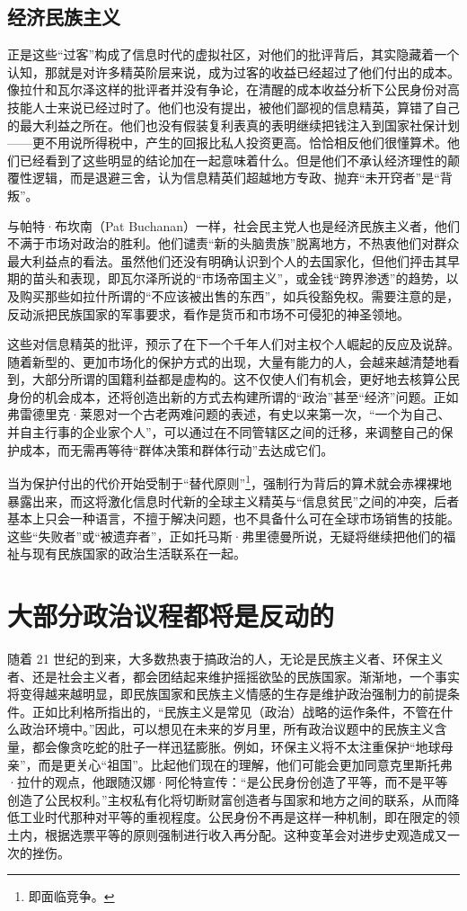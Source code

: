 \subsection{经济民族主义}
正是这些“过客”构成了信息时代的虚拟社区，对他们的批评背后，其实隐藏着一个认知，那就是对许多精英阶层来说，成为过客的收益已经超过了他们付出的成本。像拉什和瓦尔泽这样的批评者并没有争论，在清醒的成本收益分析下公民身份对高技能人士来说已经过时了。他们也没有提出，被他们鄙视的信息精英，算错了自己的最大利益之所在。他们也没有假装复利表真的表明继续把钱注入到国家社保计划——更不用说所得税中，产生的回报比私人投资更高。恰恰相反他们很懂算术。他们已经看到了这些明显的结论加在一起意味着什么。但是他们不承认经济理性的颠覆性逻辑，而是退避三舍，认为信息精英们超越地方专政、抛弃“未开窍者”是“背叛”。

与帕特·布坎南（Pat Buchanan）一样，社会民主党人也是经济民族主义者，他们不满于市场对政治的胜利。他们谴责“新的头脑贵族”脱离地方，不热衷他们对群众最大利益点的看法。虽然他们还没有明确认识到个人的去国家化，但他们抨击其早期的苗头和表现，即瓦尔泽所说的“市场帝国主义”，或金钱“跨界渗透”的趋势，以及购买那些如拉什所谓的“不应该被出售的东西”，如兵役豁免权。需要注意的是，反动派把民族国家的军事要求，看作是货币和市场不可侵犯的神圣领地。

这些对信息精英的批评，预示了在下一个千年人们对主权个人崛起的反应及说辞。随着新型的、更加市场化的保护方式的出现，大量有能力的人，会越来越清楚地看到，大部分所谓的国籍利益都是虚构的。这不仅使人们有机会，更好地去核算公民身份的机会成本，还将创造出新的方式去构建所谓的“政治”甚至“经济”问题。正如弗雷德里克·莱恩对一个古老两难问题的表述，有史以来第一次，“一个为自己、并自主行事的企业家个人”，可以通过在不同管辖区之间的迁移，来调整自己的保护成本，而无需再等待“群体决策和群体行动”去达成它们。

当为保护付出的代价开始受制于“替代原则”\footnote{即面临竞争。}，强制行为背后的算术就会赤裸裸地暴露出来，而这将激化信息时代新的全球主义精英与“信息贫民”之间的冲突，后者基本上只会一种语言，不擅于解决问题，也不具备什么可在全球市场销售的技能。这些“失败者”或“被遗弃者”，正如托马斯·弗里德曼所说，无疑将继续把他们的福祉与现有民族国家的政治生活联系在一起。

\section{大部分政治议程都将是反动的}
随着 21 世纪的到来，大多数热衷于搞政治的人，无论是民族主义者、环保主义者、还是社会主义者，都会团结起来维护摇摇欲坠的民族国家。渐渐地，一个事实将变得越来越明显，即民族国家和民族主义情感的生存是维护政治强制力的前提条件。正如比利格所指出的，“民族主义是常见（政治）战略的运作条件，不管在什么政治环境中。”因此，可以想见在未来的岁月里，所有政治议题中的民族主义含量，都会像贪吃蛇的肚子一样迅猛膨胀。例如，环保主义将不太注重保护“地球母亲”，而是更关心“祖国”。比起他们现在的理解，他们可能会更加同意克里斯托弗·拉什的观点，他跟随汉娜·阿伦特宣传：“是公民身份创造了平等，而不是平等创造了公民权利。”主权私有化将切断财富创造者与国家和地方之间的联系，从而降低工业时代那种对平等的重视程度。公民身份不再是这样一种机制，即在限定的领土内，根据选票平等的原则强制进行收入再分配。这种变革会对进步史观造成又一次的挫伤。

